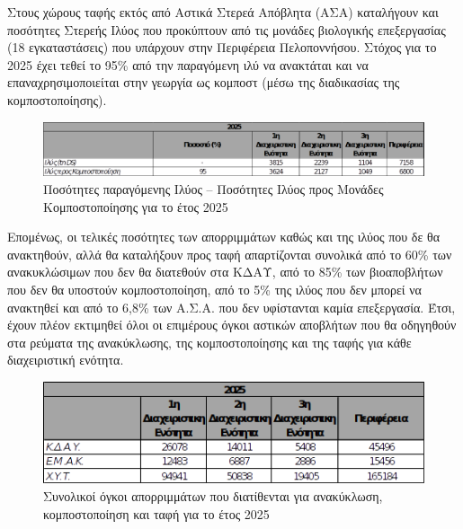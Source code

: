 \documentclass[12pt]{article}
\begin{document}
	Στους χώρους ταφής εκτός από Αστικά Στερεά Απόβλητα (ΑΣΑ) καταλήγουν και ποσότητες Στερεής Ιλύος που προκύπτουν από τις μονάδες βιολογικής επεξεργασίας (18 εγκαταστάσεις) που υπάρχουν στην Περιφέρεια Πελοποννήσου. Στόχος για το 2025 έχει τεθεί το 95\% από την παραγόμενη ιλύ να ανακτάται και να επαναχρησιμοποιείται στην γεωργία ως κομποστ (μέσω της διαδικασίας της κομποστοποίησης).
	
	\begin{figure} [H]
		\begin{center}
			\includegraphics [scale = 0.45] {table19.png}
			\caption{Ποσότητες παραγόμενης Ιλύος – Ποσότητες Ιλύος προς Μονάδες Κομποστοποίησης για το έτος 2025}
		\end{center}
	\end{figure}

	Επομένως, οι τελικές ποσότητες των απορριμμάτων καθώς και της ιλύος που δε θα ανακτηθούν, αλλά θα καταλήξουν προς ταφή απαρτίζονται συνολικά από το 60\% των ανακυκλώσιμων που δεν θα διατεθούν στα ΚΔΑΥ, από το 85\% των βιοαποβλήτων που δεν θα υποστούν κομποστοποίηση, από το 5\% της ιλύος που δεν μπορεί να ανακτηθεί και από το 6,8\% των Α.Σ.Α. που δεν υφίστανται καμία επεξεργασία. Έτσι, έχουν πλέον εκτιμηθεί όλοι οι επιμέρους όγκοι αστικών αποβλήτων που θα οδηγηθούν στα ρεύματα της ανακύκλωσης, της κομποστοποίησης και της ταφής για κάθε διαχειριστική ενότητα.
	
	\begin{figure} [H]
		\begin{center}
			\includegraphics [scale = 0.95] {table20.png}
			\caption{Συνολικοί όγκοι απορριμμάτων που διατίθενται για ανακύκλωση, κομποστοποίηση και ταφή για το έτος 2025}
		\end{center}
	\end{figure}
\end{document}
